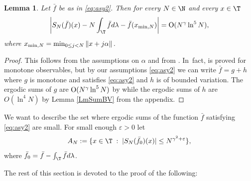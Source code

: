 \documentclass[10pt]{amsart}
\let\DS\relax
\let\eps\varepsilon
\theoremstyle{definition}
\theoremstyle{plain}
\newtheorem{lemma}[definition]{Lemma}
\begin{document}
 \label{sec.preliminaries}

\begin{lemma}\label{lem:DK0}Let $\bar{f}$ be as in \eqref{eq:asy2}. Then for every $N\in \N$ and every $x\in \T$
\[
\biggl|S_N(\bar{f})(x)- N\int_\T \bar{f}d \lambda-\bar{f}(x_{\min,N})\biggr|={\rm O}(N^\gamma\ln^{5} N),
\]
where $x_{\min,N}=\DS \min_{0\leq j<N} \|x+j\alpha\|$.
\end{lemma}

\begin{proof}
This follows from the assumptions on $\alpha$ and from \cite[Prop.\,5.2]{CW}.
In~fact, \cite[Prop.\,5.2]{CW} is proved for monotone observables,
but by our assumptions \eqref{eq:asy2} we can write $\bar{f}=g+h$ where $g$ is monotone and satisfies \eqref{eq:asy2} and $h$ is of bounded variation.
The ergodic sums of $g$ are ${\rm O}(N^\gamma\ln^{5} N)$ by \cite{CW}
while the ergodic sums of $h$ are $O(\ln^4 N)$ by Lemma \ref{LmSumBV}
{from the appendix}.
\end{proof}

We want to describe the set where ergodic sums of the function $\bar{f}$ satisfying \eqref{eq:asy2} are small. For small enough $\eps>0$ let
\begin{equation}\label{eq:an0}
A_N:=\{x\in \T\;:\; |S_N(\bar{f}_0)(x)|\leq N^{\gamma^2+\eps}\},
\end{equation}
where $\bar{f}_0=\bar{f}-\int_\T \bar{f} d \lambda$.

The rest of this section is devoted to the proof of the following:
\end{document}
